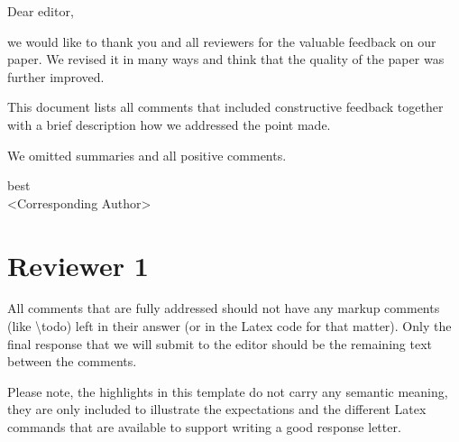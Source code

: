 \documentclass{response-letter-style}
\begin{document}
Dear editor,

we would like to thank you and all reviewers for the valuable feedback on our paper.
We revised it in many ways and think that the quality of the paper was further improved.

This document lists all comments that included constructive feedback together with a brief description how we addressed the point made.

We omitted summaries and all positive comments.

best\\
<Corresponding Author>

\section*{Reviewer 1}






All comments that are fully addressed should not have any markup comments (like \textbackslash{}todo) left in their answer (or in the Latex code for that matter).
Only the final response that we will submit to the editor should be the remaining text between the comments.


Please note, the highlights in this template do not carry any semantic meaning, they are only included to illustrate the expectations and the different Latex commands that are available to support writing a good response letter.
\end{document}

